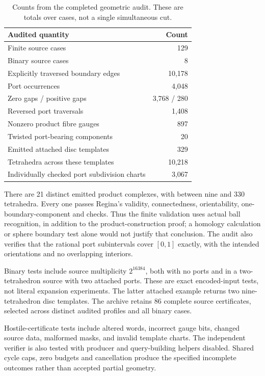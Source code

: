 \begin{table}[htbp]
\centering
\begin{tabular}{@{}lr@{}}
\toprule
Audited quantity & Count\\
\midrule
Finite source cases & 129\\
Binary source cases & 8\\
Explicitly traversed boundary edges & 10,178\\
Port occurrences & 4,048\\
Zero gaps / positive gaps & 3,768 / 280\\
Reversed port traversals & 1,408\\
Nonzero product fibre gauges & 897\\
Twisted port-bearing components & 20\\
Emitted attached disc templates & 329\\
Tetrahedra across these templates & 10,218\\
Individually checked port subdivision charts & 3,067\\
\bottomrule
\end{tabular}
\caption{Counts from the completed geometric audit. These are totals
over cases, not a single simultaneous cut.}
\end{table}

There are 21 distinct emitted product complexes, with between nine
and 330 tetrahedra. Every one passes Regina's validity, connectedness,
orientability, one-boundary-component and  checks.
Thus the finite validation uses actual ball recognition, in addition
to the product-construction proof; a homology calculation or sphere
boundary test alone would not justify that conclusion. The audit also
verifies that the rational port subintervals cover \([0,1]\) exactly,
with the intended orientations and no overlapping interiors.

Binary tests include source multiplicity \(2^{16384}\), both with no
ports and in a two-tetrahedron source with two attached ports. These
are exact encoded-input tests, not literal expansion experiments.
The latter attached example returns two nine-tetrahedron disc
templates. The archive retains 86 complete source certificates,
selected across distinct audited profiles and all binary cases.

Hostile-certificate tests include altered words, incorrect gauge bits,
changed source data, malformed masks, and invalid template charts.
The independent verifier is also tested with producer and query-building
helpers disabled. Shared cycle caps, zero budgets and cancellation
produce the specified incomplete outcomes rather than accepted partial
geometry.


